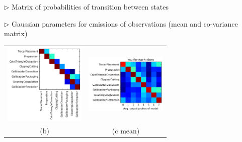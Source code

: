 \documentclass[landscape,a0paper,fontscale=0.292]{baposter}
\begin{document}
\begin{poster}
{$\triangleright$ Matrix of probabilities of transition between states

$\triangleright$ Gaussian parameters for emissions of observations (mean and co-variance matrix)


\begin{tabular}{cc}
\hspace{-3mm} \includegraphics[width=3.9cm]{../slides/images/index.png} & \hspace{-4mm} \includegraphics[width=3.9cm]{../slides/images/index2.png} \\
(b) & (c mean) \\
\end{tabular}


}

%
%
%
%
%
%
%


\end{poster}
\end{document}

